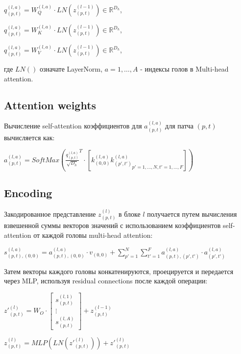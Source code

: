 \documentclass[PMI,VKR]{HSEUniversity}
\begin{document}
\begin{center}
$q_{(p, t)}^{(l, a)} = W_{Q}^{(l, a)} \cdot LN(z_{(p, t)}^{(l-1)}) \in \mathds{R}^{D_{h}}$,

$q_{(p, t)}^{(l, a)} = W_{K}^{(l, a)} \cdot LN(z_{(p, t)}^{(l-1)}) \in \mathds{R}^{D_{h}}$,

$q_{(p, t)}^{(l, a)} = W_{V}^{(l, a)} \cdot LN(z_{(p, t)}^{(l-1)}) \in \mathds{R}^{D_{h}}$,   
\end{center}
где $LN()$ означате LayerNorm, $a = 1, \dots, A$ - индексы голов в Multi-head attention.

\subsection{Attention weights}
Вычисление self-attention коэффициентов для $a_{(p, t)}^{(l, a)}$ для патча $(p, t)$ вычисляется как:

\begin{center}
$a_{(p, t)}^{(l, a)} = SoftMax(\frac{q_{(p, t)}^{(l, a)}}{\sqrt{D_{h}}}^{T} \cdot \left[k_{(0, 0)}^{(l, a)} {k_{(p', t')}^{(l, a)}}_{p' = 1, \dots, N, t' = 1, \dots, F} \right])$
\end{center}

\subsection{Encoding}

Закодированное представление $z_{(p, t)}^{(l)}$ в блоке $l$ получается путем вычисления взвешенной суммы векторов значений с использованием коэффициентов self-attention от каждой головы multi-head attention:

\begin{center}
$s_{(p, t),(0, 0)}^{(l, a)} = a_{(p, t),(0, 0)}^{(l, a)} \cdot v_{(0, 0)} + \sum\limits_{p'=1}^N \sum\limits_{t'=1}^F a_{(p, t),(p', t')}^{(l, a)} \cdot a_{(p', t')}^{(l, a)}$
\end{center}

Затем векторы каждого головы конкатенируются, проецируется и передается через MLP, используя residual connections после каждой операции:

\begin{center}
$z'_{(p, t)}^{(l)} = W_{O} \cdot \begin{bmatrix} 
  s_{(p, t)}^{(l, 1)} \\
  \vdots  \\
  s_{(p, t)}^{(l, A)}
\end{bmatrix} + z_{(p, t)}^{(l - 1)}$

$z_{(p, t)}^{(l)} = MLP(LN(z'_{(p, t)}^{(l)})) + z'_{(p, t)}^{(l)}$
\end{center}
\end{document}
